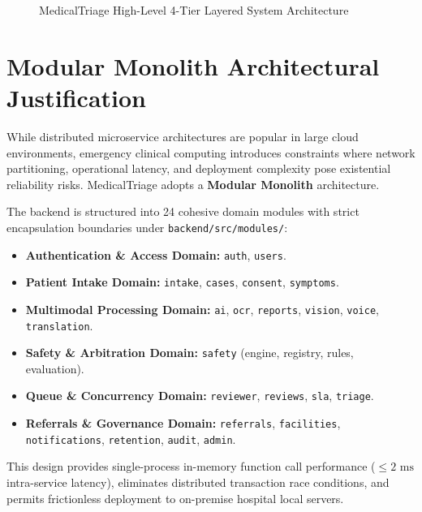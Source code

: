 \documentclass[11pt,a4paper,oneside]{report}
\begin{document}
\begin{figure}[htbp]
  \caption{MedicalTriage High-Level 4-Tier Layered System Architecture}
  \label{fig:layered_arch}
\end{figure}

\section{Modular Monolith Architectural Justification}
While distributed microservice architectures are popular in large cloud environments, emergency clinical computing introduces constraints where network partitioning, operational latency, and deployment complexity pose existential reliability risks. MedicalTriage adopts a \textbf{Modular Monolith} architecture.

The backend is structured into 24 cohesive domain modules with strict encapsulation boundaries under \texttt{backend/src/modules/}:
\begin{itemize}[leftmargin=20pt]
  \item \textbf{Authentication \& Access Domain:} \texttt{auth}, \texttt{users}.
  \item \textbf{Patient Intake Domain:} \texttt{intake}, \texttt{cases}, \texttt{consent}, \texttt{symptoms}.
  \item \textbf{Multimodal Processing Domain:} \texttt{ai}, \texttt{ocr}, \texttt{reports}, \texttt{vision}, \texttt{voice}, \texttt{translation}.
  \item \textbf{Safety \& Arbitration Domain:} \texttt{safety} (engine, registry, rules, evaluation).
  \item \textbf{Queue \& Concurrency Domain:} \texttt{reviewer}, \texttt{reviews}, \texttt{sla}, \texttt{triage}.
  \item \textbf{Referrals \& Governance Domain:} \texttt{referrals}, \texttt{facilities}, \texttt{notifications}, \texttt{retention}, \texttt{audit}, \texttt{admin}.
\end{itemize}

This design provides single-process in-memory function call performance ($\le 2\text{ ms}$ intra-service latency), eliminates distributed transaction race conditions, and permits frictionless deployment to on-premise hospital local servers.
\end{document}
